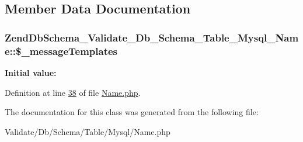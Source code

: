 \subsection{\-Member \-Data \-Documentation}
\hypertarget{classZendDbSchema__Validate__Db__Schema__Table__Mysql__Name_a15352eefd28057c9a0c81ca518c6cd64}{
\subsubsection[{\$\-\_\-message\-Templates}]{\setlength{\rightskip}{0pt plus 5cm}\-Zend\-Db\-Schema\-\_\-\-Validate\-\_\-\-Db\-\_\-\-Schema\-\_\-\-Table\-\_\-\-Mysql\-\_\-\-Name\-::\$\-\_\-message\-Templates}}\label{classZendDbSchema__Validate__Db__Schema__Table__Mysql__Name_a15352eefd28057c9a0c81ca518c6cd64}
{\bfseries \-Initial value\-:}


\-Definition at line \hyperlink{Table_2Mysql_2Name_8php_source_l00038}{38} of file \hyperlink{Table_2Mysql_2Name_8php_source}{\-Name.\-php}.



\-The documentation for this class was generated from the following file\-:\begin{DoxyCompactItemize}
\item 
\-Validate/\-Db/\-Schema/\-Table/\-Mysql/\-Name.\-php\end{DoxyCompactItemize}
